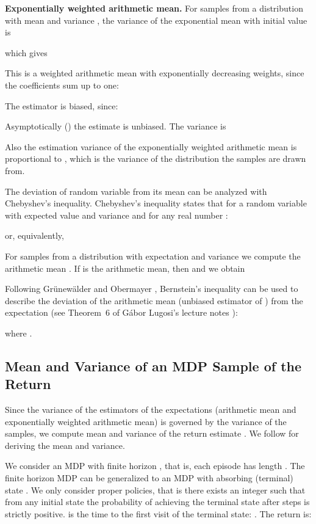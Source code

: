 \documentclass{article}
\begin{document}
\begin{appendices}
{\bf Exponentially weighted arithmetic mean.}
For  samples  from a distribution with mean
 and variance , the variance of the exponential mean with initial value  is

which gives


This is a weighted arithmetic mean with 
exponentially decreasing weights, 
since the coefficients sum up to one:




The estimator  is biased, since:

Asymptotically () the estimate is unbiased.
The variance is

Also the estimation variance of the exponentially weighted arithmetic mean is proportional to ,
which is the variance of the distribution the samples are drawn from.

The deviation of random variable  from its
mean  can be analyzed with Chebyshev's inequality.
Chebyshev's inequality \cite{Bienayme:53,Chebyshev:67} states that for 
a random variable  with expected value 
and variance  and for any real number :

or, equivalently,


For  samples  from a distribution with expectation
 and variance  we compute the arithmetic mean
.
If  is the arithmetic mean, then
 and we obtain




Following Gr{\"{u}}new{\"{a}}lder and Obermayer \cite{Grunewalder:11},
Bernstein's inequality can be used to describe the deviation of
the arithmetic mean (unbiased estimator of )
from the expectation 
(see Theorem~6 of G{\'{a}}bor Lugosi's
lecture notes \cite{Lugosi:03}):

where .


\subsection{Mean and Variance of an MDP Sample of the Return}
\label{sec:Abias_variance_sample}

Since the variance of the estimators of the expectations (arithmetic mean and 
exponentially weighted arithmetic mean) is governed by the variance of the samples, 
we compute mean and variance of the return estimate . 
We follow
\cite{Sobel:82,Tamar:12,Tamar:16} for deriving the mean and variance.

We consider an MDP with finite horizon , 
that is, each episode has length .
The finite horizon MDP can be generalized to an MDP 
with absorbing (terminal) state .
We only consider proper policies, that is there exists an integer 
such that from any initial state the probability of achieving
the terminal state  after  steps is strictly positive.
 is the time to the
first visit of the terminal state: .
The return  is:



\end{appendices}
\end{document}
